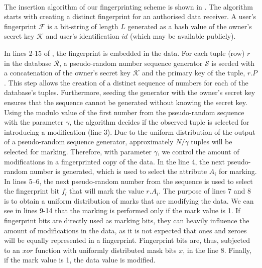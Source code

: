 \documentclass[runningheads]{llncs}
\begin{document}
\paragraph{}
The insertion algorithm of our fingerprinting scheme is shown in .
The algorithm starts with creating a distinct fingerprint for an authorised data receiver.
A user's fingerprint $\mathcal{F}$ is a bit-string of length $L$ generated as a hash value of the owner's secret key $\mathcal{K}$ and user's identification $id$ (which may be available publicly). 

In lines 2-15 of , the fingerprint is embedded in the data. 
For each tuple (row) $r$ in the database $\mathcal{R}$, a pseudo-random number sequence generator $\mathcal{S}$ is seeded with a concatenation of the owner's secret key $\mathcal{K}$ and the primary key of the tuple, $r.P$. 
This step allows the creation of a distinct sequence of numbers for each of the database's tuples. 
Furthermore, seeding the generator with the owner's secret key ensures that the sequence cannot be generated without knowing the secret key. 
Using the modulo value of the first number from the pseudo-random sequence with the parameter $\gamma$, the algorithm decides if the observed tuple is selected for introducing a modification (line 3). 
Due to the uniform distribution of the output of a pseudo-random sequence generator, approximately $N/\gamma$ tuples will be selected for marking. 
Therefore, with parameter $\gamma$, we control the amount of modifications in a fingerprinted copy of the data. 
In the line 4, the next pseudo-random number is generated, which is used to select the attribute $A_i$ for marking.
In lines 5--6, the next pseudo-random number from the sequence is used to select the fingerprint bit $f_l$ that will mark the value $r.A_i$. 
The purpose of lines 7 and 8 is to obtain a uniform distribution of marks that are modifying the data. 
We can see in lines 9-14 that the marking is performed only if the mark value is 1. 
If fingerprint bits are directly used as marking bits, they can heavily influence the amount of modifications in the data, as it is not expected that ones and zeroes will be equally represented in a fingerprint.
Fingerprint bits are, thus, subjected to an $xor$ function with uniformly distributed mask bits $x$, in the line 8.
Finally, if the mark value is 1, the data value is modified. 
\end{document}
